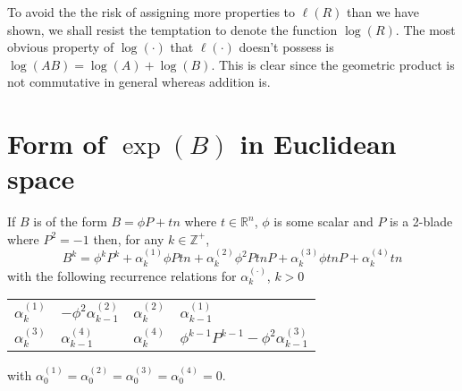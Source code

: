 To avoid the the risk of assigning more properties to $\ell(R)$ than we have shown, we shall
resist the temptation to denote the function $\log(R)$. The most obvious property of $\log(\cdot)$ that
$\ell(\cdot)$ doesn't possess is $\log(AB) = \log(A) + \log(B)$. This is clear since the geometric product
is not commutative in general whereas addition is.

\section{Form of $\exp(B)$ in Euclidean space}
\label{subsec:form}

\begin{lemma}
\label{lem:bk}
If $B$ is of the form $B=\phi P+tn$ where 
$t \in \mathbb{R}^n$, $\phi$ is some scalar and $P$ is a 2-blade 
where $P^2 = -1$ then, for any $k \in \mathbb{Z}^+$, 
\[
B^{k}=\phi^k P^{k}+\alpha _{k}^{(1)}\phi Ptn+
\alpha _{k}^{(2)}\phi^2 PtnP+\alpha _{k}^{(3)}\phi tnP+\alpha _{k}^{(4)}tn
\]
with the following recurrence relations for $\alpha _{k}^{(\cdot )}$,
$k>0$ 

\begin{centering}

\begin{tabular}{r@{$\ =\ $}lr@{$\ =\ $}l}
$\alpha _{k}^{(1)}$ & $- \phi^2 \alpha _{k-1}^{(2)}$ &
$\alpha _{k}^{(2)}$ & $\alpha _{k-1}^{(1)}$\\
$\alpha _{k}^{(3)}$ & $\alpha _{k-1}^{(4)}$ &
$\alpha _{k}^{(4)}$ & $\phi^{k-1}P^{k-1} - \phi^2 \alpha_{k-1}^{(3)}$
\end{tabular}

\end{centering}

\noindent with 
$\alpha _{0}^{(1)}=\alpha _{0}^{(2)}=
\alpha _{0}^{(3)}=\alpha _{0}^{(4)}=0$.
\end{lemma}

